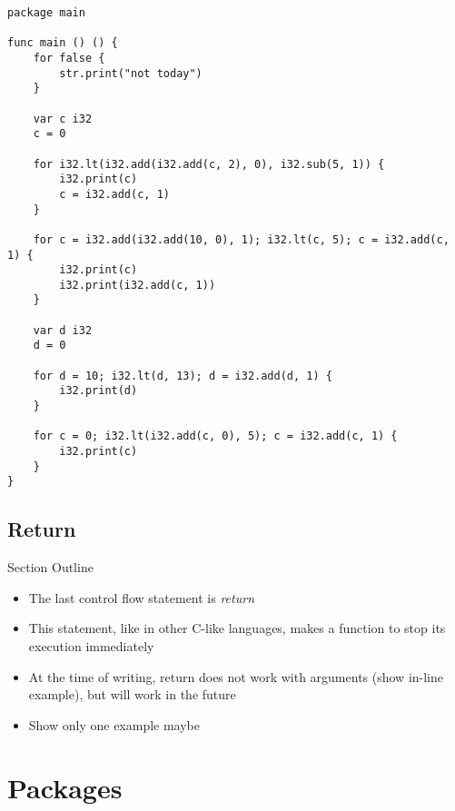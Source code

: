 \documentclass[11pt,fleqn,openany]{book} %
\begin{document}
\begin{lstlisting}[caption={Using For Loop for Control Flow},captionpos=b,label={listing:for-loop-example1}]
package main

func main () () {
	for false {
		str.print("not today")
	}
	
	var c i32
	c = 0

	for i32.lt(i32.add(i32.add(c, 2), 0), i32.sub(5, 1)) {
		i32.print(c)
		c = i32.add(c, 1)
	}

	for c = i32.add(i32.add(10, 0), 1); i32.lt(c, 5); c = i32.add(c, 1) {
		i32.print(c)
		i32.print(i32.add(c, 1))
	}

	var d i32
	d = 0

	for d = 10; i32.lt(d, 13); d = i32.add(d, 1) {
		i32.print(d)
	}

	for c = 0; i32.lt(i32.add(c, 0), 5); c = i32.add(c, 1) {
		i32.print(c)
	}
}
\end{lstlisting}

\section{Return}

\begin{remark}
Section Outline
    \begin{itemize}
    	\item The last control flow statement is \textit{return}
        \item This statement, like in other C-like languages, makes a function to stop its execution immediately
        \item At the time of writing, return does not work with arguments (show in-line example), but will work in the future
        \item Show only one example maybe
    \end{itemize}
\end{remark}


\chapter{Packages}
\label{chapter:packages}
\end{document}
